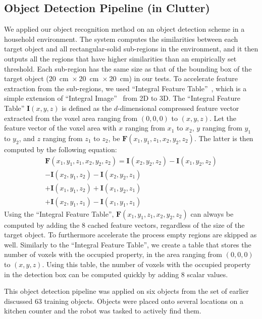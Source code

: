 \documentclass[a4paper, 10 pt, conference]{sty/ieeeconf}
\begin{document}
\subsection{Object Detection Pipeline (in Clutter)}
\label{sec:recognition}
We applied our object recognition method on an object detection scheme in a household
environment. The system computes the similarities between each target object and all 
rectangular-solid sub-regions in the environment, and it then outputs all the regions
that have higher similarities than an empirically set threshold.
Each sub-region has the same size as that of the bounding box of the target object 
($20$~cm~$\times~20$~cm~$\times~20$~cm) in our tests.
To accelerate feature extraction from the sub-regions, we used ``Integral Feature Table''~\cite{kanezaki2010tvc}, 
which is a simple extension of ``Integral Image''~\cite{integral_image} from 2D to 3D.
The ``Integral Feature Table'' $\bm{I}(x,y,z)$ is defined as the $d$-dimensional 
compressed feature vector extracted from the voxel area ranging from $(0,0,0)$ to $(x,y,z)$.
Let the feature vector of the voxel area with $x$ ranging from $x_1$ to $x_2$,
$y$ ranging from $y_1$ to $y_2$, and $z$ ranging from $z_1$ to $z_2$, be $\bm{F}(x_1,y_1,z_1,x_2,y_2,z_2)$.
The latter is then computed by the following equation:
\begin{eqnarray*}\label{eq:sat}
\bm{F}(x_1,y_1,z_1,x_2,y_2,z_2) = \bm{I}(x_2,y_2,z_2) - \bm{I}(x_1,y_2,z_2)
                           \\ - \bm{I}(x_2,y_1,z_2) - \bm{I}(x_2,y_2,z_1)
                           \\ + \bm{I}(x_1,y_1,z_2) + \bm{I}(x_1,y_2,z_1)
                           \\ + \bm{I}(x_2,y_1,z_1) - \bm{I}(x_1,y_1,z_1)
\end{eqnarray*}
Using the ``Integral Feature Table'', $\bm{F}(x_1,y_1,z_1,x_2,y_2,z_2)$ can always be 
computed by adding the 8 cached feature vectors, regardless of the size of the target object.
To furthermore accelerate the process empty regions are skipped as well.
Similarly to the ``Integral Feature Table'', we create a table that stores
the number of voxels with the occupied property, in the area ranging from $(0,0,0)$ to $(x,y,z)$.
Using this table, the number of voxels with the occupied property in the detection 
box can be computed quickly by adding 8 scalar values.

This object detection pipeline was applied on six objects from the set of 
earlier discussed 63 training objects. Objects were placed onto several locations on a kitchen counter and the robot was tasked to actively find them.
\end{document}
